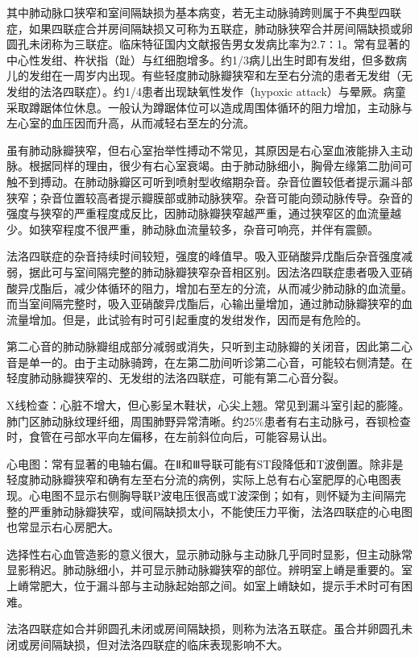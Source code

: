其中肺动脉口狭窄和室间隔缺损为基本病变，若无主动脉骑跨则属于不典型四联症，如果四联症合并房间隔缺损又可称为五联症，肺动脉狭窄合并房间隔缺损或卵圆孔未闭称为三联症。临床特征国内文献报告男女发病比率为2.7∶1。常有显著的中心性发绀、杵状指（趾）与红细胞增多。约1/3病儿出生时即有发绀，但多数病儿的发绀在一周岁内出现。有些轻度肺动脉瓣狭窄和左至右分流的患者无发绀（无发绀的法洛四联症）。约1/4患者出现缺氧性发作（hypoxic
attack）与晕厥。病童采取蹲踞体位休息。一般认为蹲踞体位可以造成周围体循环的阻力增加，主动脉与左心室的血压因而升高，从而减轻右至左的分流。

虽有肺动脉瓣狭窄，但右心室抬举性搏动不常见，其原因是右心室血液能排入主动脉。根据同样的理由，很少有右心室衰竭。由于肺动脉细小，胸骨左缘第二肋间可触不到搏动。在肺动脉瓣区可听到喷射型收缩期杂音。杂音位置较低者提示漏斗部狭窄；杂音位置较高者提示瓣膜部或肺动脉狭窄。杂音可能向颈动脉传导。杂音的强度与狭窄的严重程度成反比，因肺动脉瓣狭窄越严重，通过狭窄区的血流量越少。如狭窄程度不很严重，肺动脉血流量较多，杂音可响亮，并伴有震颤。

法洛四联症的杂音持续时间较短，强度的峰值早。吸入亚硝酸异戊酯后杂音强度减弱，据此可与室间隔完整的肺动脉瓣狭窄杂音相区别。因法洛四联症患者吸入亚硝酸异戊酯后，减少体循环的阻力，增加右至左的分流，从而减少肺动脉的血流量。而当室间隔完整时，吸入亚硝酸异戊酯后，心输出量增加，通过肺动脉瓣狭窄的血流量增加。但是，此试验有时可引起重度的发绀发作，因而是有危险的。

第二心音的肺动脉瓣组成部分减弱或消失，只听到主动脉瓣的关闭音，因此第二心音是单一的。由于主动脉骑跨，在左第二肋间听诊第二心音，可能较右侧清楚。在轻度肺动脉瓣狭窄的、无发绀的法洛四联症，可能有第二心音分裂。

X线检查：心脏不增大，但心影呈木鞋状，心尖上翘。常见到漏斗室引起的膨隆。肺门区肺动脉纹理纤细，周围肺野异常清晰。约25\%患者有右主动脉弓，吞钡检查时，食管在弓部水平向左偏移，在左前斜位向后，可能容易认出。

心电图：常有显著的电轴右偏。在Ⅱ和Ⅲ导联可能有ST段降低和T波倒置。除非是轻度肺动脉瓣狭窄和确有左至右分流的病例，实际上总有右心室肥厚的心电图表现。心电图不显示右侧胸导联P波电压很高或T波深倒；如有，则怀疑为主间隔完整的严重肺动脉瓣狭窄，或间隔缺损太小，不能使压力平衡，法洛四联症的心电图也常显示右心房肥大。

选择性右心血管造影的意义很大，显示肺动脉与主动脉几乎同时显影，但主动脉常显影稍迟。肺动脉细小，并可显示肺动脉瓣狭窄的部位。辨明室上嵴是重要的。室上嵴常肥大，位于漏斗部与主动脉起始部之间。如室上嵴缺如，提示手术时可有困难。

法洛四联症如合并卵圆孔未闭或房间隔缺损，则称为法洛五联症。虽合并卵圆孔未闭或房间隔缺损，但对法洛四联症的临床表现影响不大。

